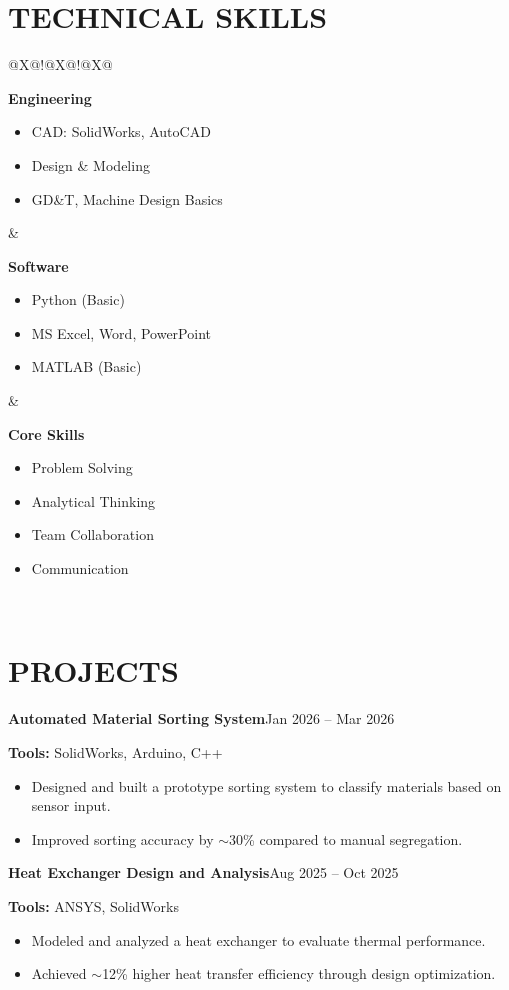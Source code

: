 \documentclass[10pt]{article}
\newcommand{\entry}[2]{\textbf{#1}\hfill #2\par}
\newcommand{\skillgroup}[2]{%
  \begin{minipage}[t]{\linewidth}
  {\color{navy}\bfseries\fontsize{11}{13}\selectfont #1}\par\vspace{1pt}
  \begin{itemize}[leftmargin=12pt, topsep=0pt, partopsep=0pt]#2\end{itemize}
  \end{minipage}}
\begin{document}
\section{TECHNICAL SKILLS}
\begin{tabularx}{\linewidth}{@{\hspace{6pt}}X@{\hspace{10pt}}!{\color{divider}\vrule}@{\hspace{12pt}}X@{\hspace{10pt}}!{\color{divider}\vrule}@{\hspace{12pt}}X@{}}
\skillgroup{Engineering}{
  \item CAD: SolidWorks, AutoCAD
  \item Design \& Modeling
  \item GD\&T, Machine Design Basics} &
\skillgroup{Software}{
  \item Python (Basic)
  \item MS Excel, Word, PowerPoint
  \item MATLAB (Basic)} &
\skillgroup{Core Skills}{
  \item Problem Solving
  \item Analytical Thinking
  \item Team Collaboration
  \item Communication} \\
\end{tabularx}

\section{PROJECTS}
\entry{Automated Material Sorting System}{Jan 2026 -- Mar 2026}
\textbf{Tools:} SolidWorks, Arduino, C++
\begin{itemize}
  \item Designed and built a prototype sorting system to classify materials based on sensor input.
  \item Improved sorting accuracy by $\sim$30\% compared to manual segregation.
\end{itemize}
\vspace{5pt}

\entry{Heat Exchanger Design and Analysis}{Aug 2025 -- Oct 2025}
\textbf{Tools:} ANSYS, SolidWorks
\begin{itemize}
  \item Modeled and analyzed a heat exchanger to evaluate thermal performance.
  \item Achieved $\sim$12\% higher heat transfer efficiency through design optimization.
\end{itemize}
\end{document}
